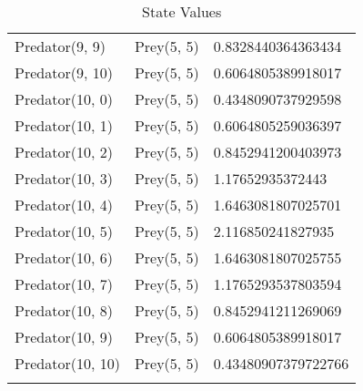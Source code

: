 \begin{longtable}{| p{} | p{} | p{} |}
Predator(9, 9) & Prey(5, 5) &0.8328440364363434\\
Predator(9, 10) & Prey(5, 5) &0.6064805389918017\\
Predator(10, 0) & Prey(5, 5) &0.4348090737929598\\
Predator(10, 1) & Prey(5, 5) &0.6064805259036397\\
Predator(10, 2) & Prey(5, 5) &0.8452941200403973\\
Predator(10, 3) & Prey(5, 5) &1.17652935372443\\
Predator(10, 4) & Prey(5, 5) &1.6463081807025701\\
Predator(10, 5) & Prey(5, 5) &2.116850241827935\\
Predator(10, 6) & Prey(5, 5) &1.6463081807025755\\
Predator(10, 7) & Prey(5, 5) &1.1765293537803594\\
Predator(10, 8) & Prey(5, 5) &0.8452941211269069\\
Predator(10, 9) & Prey(5, 5) &0.6064805389918017\\
Predator(10, 10) & Prey(5, 5) &0.43480907379722766\\
\caption{State Values} 
\label{tab:myfirstlongtable}
\end{longtable}

